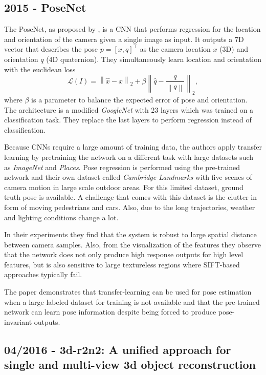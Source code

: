 	\subsection{2015 - PoseNet}
		The PoseNet, as proposed by \cite{kendall2015posenet}, is a CNN that performs regression for the location and orientation of the camera given a single image as input.
		It outputs a 7D vector that describes the pose $p = [x, q]^\top$ as the camera location $x$ (3D) and orientation $q$ (4D quaternion).
		They simultaneously learn location and orientation with the euclidean loss
		\begin{equation}
			\mathcal{L}(I) = 
			\left\|
				\hat{x} - x 
			\right\|_2 
			+ \beta 
			\left\| 
				\hat{q} - \frac{q}{\left\| q \right\|} 
			\right\|_2,
		\end{equation}
		where $\beta$ is a parameter to balance the expected error of pose and orientation.
		The architecture is a modified \emph{GoogleNet} with 23 layers which was trained on a classification task.
		They replace the last layers to perform regression instead of classification.
		
		Because CNNs require a large amount of training data, the authors apply transfer learning by pretraining the network on a different task with large datasets such as \emph{ImageNet} and \emph{Places}.
		Pose regression is performed using the pre-trained network and their own dataset called \emph{Cambridge Landmarks} with five scenes of camera motion in large scale outdoor areas.
		For this limited dataset, ground truth pose is available.
		A challenge that comes with this dataset is the clutter in form of moving pedestrians and cars.
		Also, due to the long trajectories, weather and lighting conditions change a lot.
		
		In their experiments they find that the system is robust to large spatial distance between camera samples.
		Also, from the visualization of the features they observe that the network does not only produce high response outputs for high level features, but is also sensitive to large textureless regions where {SIFT}-based approaches typically fail.
		
		The paper demonstrates that transfer-learning can be used for pose estimation when a large labeled dataset for training is not available and that the pre-trained network can learn pose information despite being forced to produce pose-invariant outputs.
		
		
	\subsection{04/2016 - 3d-r2n2: A unified approach for single and multi-view 3d object reconstruction}
		
